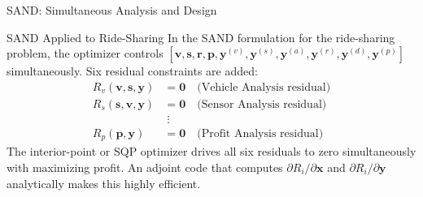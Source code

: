 \documentclass[aspectratio=169,10pt]{beamer}
\begin{document}
\begin{frame}[allowframebreaks]{SAND: Simultaneous Analysis and Design}
  \begin{exampleblock}{SAND Applied to Ride-Sharing}
    In the SAND formulation for the ride-sharing problem, the optimizer
    controls $[\mathbf{v}, \mathbf{s}, \mathbf{r}, \mathbf{p},
    \mathbf{y}^{(v)}, \mathbf{y}^{(s)}, \mathbf{y}^{(a)},
    \mathbf{y}^{(r)}, \mathbf{y}^{(d)}, \mathbf{y}^{(p)}]$ simultaneously.
    Six residual constraints are added:
    \begin{align*}
      R_v(\mathbf{v}, \mathbf{s}, \mathbf{y}) &= \mathbf{0}
        \quad \text{(Vehicle Analysis residual)}\\
      R_s(\mathbf{s}, \mathbf{v}, \mathbf{y}) &= \mathbf{0}
        \quad \text{(Sensor Analysis residual)}\\
      &\;\vdots\\
      R_p(\mathbf{p}, \mathbf{y}) &= \mathbf{0}
        \quad \text{(Profit Analysis residual)}
    \end{align*}
    The interior-point or SQP optimizer drives all six residuals to zero
    simultaneously with maximizing profit.  An adjoint code that computes
    $\partial R_i / \partial \mathbf{x}$ and $\partial R_i / \partial
    \mathbf{y}$ analytically makes this highly efficient.
  \end{exampleblock}

\end{frame}
\end{document}
